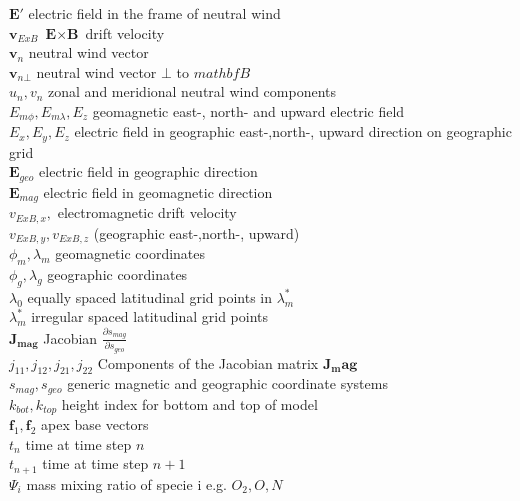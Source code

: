 \begin{tabbing}
\>$\textbf{E}'$     \> electric field in the frame of neutral wind    \\
\>$\textbf{v}_{ExB}$\> $\textbf{E} \times \textbf{B}$ drift velocity     \\
\>$\textbf{v}_n$    \> neutral wind vector    \\
\>$\textbf{v}_{n\bot}$    \> neutral wind vector $\bot$ to $mathbf{B}$     \\
\>$u_n, v_n$    \> zonal and meridional neutral wind components    \\
\>$E_{m \phi},E_{m \lambda}, E_z$     \> geomagnetic east-, north- and upward electric field   \\
\>$E_{x}, E_{y}, E_{z}$          \> electric field in geographic east-,north-, upward direction on geographic grid   \\
\>$\mathbf{E}_{geo}$             \> electric field in geographic direction    \\
\>$\mathbf{E}_{mag}$             \> electric field in geomagnetic direction    \\
\>$v_{ExB,x}, $                  \>  electromagnetic drift velocity   \\
\>$v_{ExB,y}, v_{ExB,z}$         \>  (geographic east-,north-, upward)  \\
\>$\phi_m, \lambda_m$            \> geomagnetic coordinates    \\
\>$\phi_g, \lambda_g$            \> geographic coordinates    \\
\>$\lambda_0$                    \> equally spaced latitudinal grid points in $\lambda_m^*$    \\
\>$\lambda_m^*$                  \> irregular spaced latitudinal grid points    \\
\>$\mathbf{J_{mag}}$               \> Jacobian $\frac{\partial s_{mag}}{\partial s_{geo}}$    \\
\>$j_{11},j_{12}, j_{21}, j_{22}$\> Components of the Jacobian matrix $\mathbf{J_mag}$    \\
\>$s_{mag}, s_{geo}$             \> generic magnetic and geographic coordinate systems     \\
\>$k_{bot},k_{top}$              \> height index for bottom and top of model    \\
\>$\mathbf{f}_1, \mathbf{f}_2$   \> apex base vectors    \\
\>$t_n$             \> time at time step $n$    \\
\>$t_{n+1}$         \> time at time step $n+1$    \\
\>$\Psi_i$          \> mass mixing ratio of specie i e.g. $O_2, O, N$     \\

\end{tabbing}
